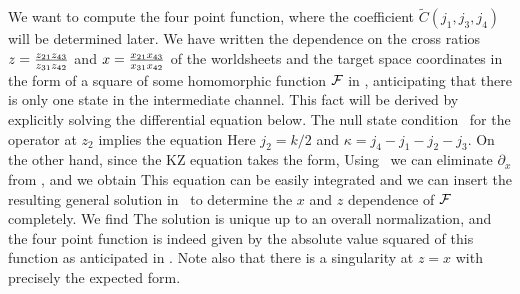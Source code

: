 We want to   compute the four point function,
\eqn{}
where the coefficient
$ \tilde C(j_1,j_3,j_4)$ will be determined later.
We have written the dependence on
the cross ratios $z = { z_{21} z_{43} \over z_{31 } z_{42} }$
and $x={x_{21} x_{43} \over x_{31} x_{42}}$ of the worldsheets
and the target space coordinates in the form of
a square of some homomorphic function ${\cal F}$ in \fpt ,
anticipating that there is only one state in the intermediate channel.
This fact will be derived by explicitly solving the differential
equation below.
The null state condition \nulldec\
for the operator at $z_2$ implies the equation
\eqn{}
Here $j_2 =  k/2 $ and $\kappa = j_4-j_1-j_2-j_3$.
On the other hand, since
\eqn{}
the KZ equation takes the form,
\eqn{}
Using  \nulle\  we can eliminate $\partial_x$ from \kz,
and we obtain
\eqn{}
This equation can be easily integrated and we can  insert the
resulting general
solution in \nulle\ to determine the $x$ and $z$ dependence
of ${\cal F}$ completely. We
find
\eqn{}
The solution is unique up to an overall normalization,
and the four point function is
indeed given by the absolute value squared of this function
as anticipated in \fpt .
Note also that there is a singularity at $z=x$ with precisely
the expected form.

